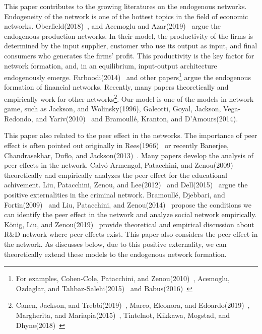 \documentclass[12pt]{article}
\theoremstyle{definition}
\begin{document}
This paper contributes to the growing literatures on the endogenous networks.
Endogeneity of the network is one of the hottest topics in the field of economic networks.
Oberfield(2018)~\cite{ober}, and Acemoglu and Azar(2019)~\cite{endo_net} argue the endogenous production networks.
In their model, the productivity of the firms is determined by the input supplier, customer who use its output as input, and final consumers who generates the firms' profit.
This productivity is the key factor for network formation, and, in an equilibrium, input-output architecture endogenously emerge.
Farboodi(2014)~\cite{farboodi} and other papers\footnote{For examples, Cohen-Cole, Patacchini, and Zenou(2010)~\cite{cohen}, Acemoglu, Ozdaglar, and Tahbaz-Salehi(2015)~\cite{acemo2015} and Babus(2016)~\cite{babus}} argue the endogenous formation of financial networks.
Recently, many papers theoretically and empirically work for other networks\footnote{Canen, Jackson, and Trebbi(2019)~\cite{canen}, Marco, Eleonora, and Edoardo(2019)~\cite{Marco2019}, Margherita, and Mariapia(2015)~\cite{marg}, Tintelnot, Kikkawa, Mogstad, and Dhyne(2018)~\cite{Tin}}.
Our model is one of the models in network game, such as Jackson, and Wolinsky(1996), Galeotti, Goyal, Jackson, Vega-Redondo, and Yariv(2010)~\cite{galeo} and Bramoull\'{e}, Kranton, and D'Amours(2014).

This paper also related to the peer effect in the networks.
The importance of peer effect is often pointed out originally in Rees(1966)~\cite{Rees} or recently Banerjee, Chandrasekhar, Duflo, and Jackson(2013)~\cite{ban}.
Many papers develop the analysis of peer effects in the network.
Calv\'{o}-Armengol, Patacchini, and Zenou(2009)~\cite{edu} theoretically and empirically analyzes the peer effect for the educational achivement.
Liu, Patacchini, Zenou, and Lee(2012)~\cite{criminal} and Dell(2015)~\cite{Dell} argue the positive externalities in the criminal network.
Bramoull\'{e}, Djebbari, and Fortin(2009)~\cite{identificationpeer} and Liu, Patacchini, and Zenou(2014)~\cite{endopeer} propose the conditions we can identify the peer effect in the network and analyze social network empirically.
K\"{o}nig, Liu, and Zenou(2019)~\cite {RandD} provide theoretical and empirical discussion about R\&D network where peer effects exist.
This paper also considers the peer effect in the network.
As discusses below, due to this positive externality, we can theoretically extend these models to the endogenous network formation.
\end{document}
